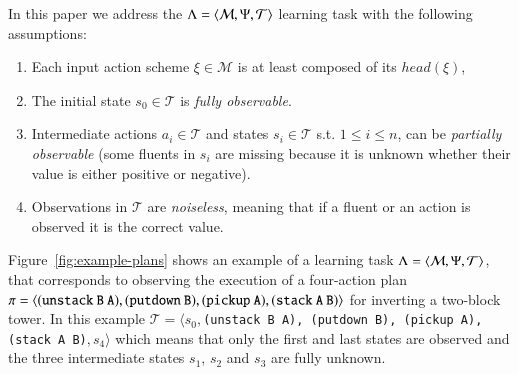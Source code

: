In this paper we address the $\Lambda={\langle \mathcal{M},\Psi,\mathcal{T} \rangle}$ learning task with the following assumptions:
\begin{enumerate}
\item Each input action scheme $\xi\in\mathcal{M}$ is at least composed of its $head(\xi)$,
\item The initial state $s_0\in\mathcal{T}$ is {\em fully observable}.
\item Intermediate actions $a_i\in\mathcal{T}$ and states $s_i\in\mathcal{T}$ s.t. {\small $1\leq i\leq n$}, can be {\em partially observable} (some fluents in $s_i$ are missing because it is unknown whether their value is either positive or negative). %
\item Observations in $\mathcal{T}$ are {\em noiseless}, meaning that if a fluent or an action is observed it is the correct value. 
\end{enumerate}
Figure~\ref{fig:example-plans} shows an example of a learning task $\Lambda={\langle \mathcal{M},\Psi,\mathcal{T} \rangle}$, that corresponds to observing the execution of a four-action plan $\pi={\langle \small\tt (unstack\ B\ A), (putdown\ B), (pickup\ A), (stack\ A\ B) \rangle}$ for inverting a two-block tower. In this example $\mathcal{T}=\langle s_0,${\small\tt (unstack\ B\ A), (putdown\ B), (pickup\ A), (stack\ A\ B)}$,s_4\rangle$ which means that only the first and last states are observed and the three intermediate states $s_1$, $s_2$ and $s_3$ are fully unknown. 

